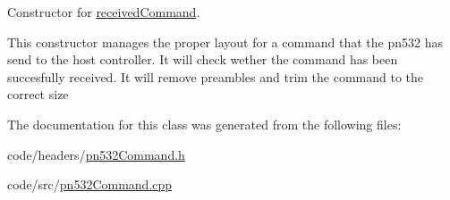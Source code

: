 Constructor for \hyperlink{classreceivedCommand}{received\+Command}. 

This constructor manages the proper layout for a command that the pn532 has send to the host controller. It will check wether the command has been succesfully received. It will remove preambles and trim the command to the correct size 

The documentation for this class was generated from the following files\+:\begin{DoxyCompactItemize}
\item 
code/headers/\hyperlink{pn532Command_8h}{pn532\+Command.\+h}\item 
code/src/\hyperlink{pn532Command_8cpp}{pn532\+Command.\+cpp}\end{DoxyCompactItemize}
